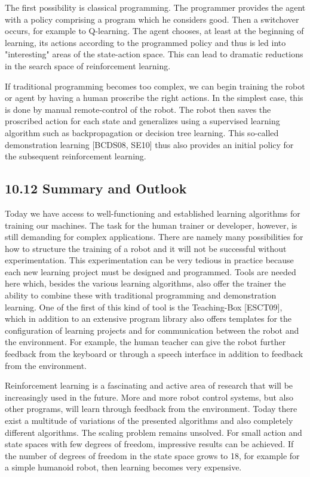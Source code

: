 \documentclass[10pt]{article}
\begin{document}
The first possibility is classical programming. The programmer provides the agent with a policy comprising a program which he considers good. Then a switchover occurs, for example to Q-learning. The agent chooses, at least at the beginning of learning, its actions according to the programmed policy and thus is led into "interesting" areas of the state-action space. This can lead to dramatic reductions in the search space of reinforcement learning.

If traditional programming becomes too complex, we can begin training the robot or agent by having a human proscribe the right actions. In the simplest case, this is done by manual remote-control of the robot. The robot then saves the proscribed action for each state and generalizes using a supervised learning algorithm such as backpropagation or decision tree learning. This so-called demonstration learning [BCDS08, SE10] thus also provides an initial policy for the subsequent reinforcement learning.

\subsection*{10.12 Summary and Outlook}
Today we have access to well-functioning and established learning algorithms for training our machines. The task for the human trainer or developer, however, is still demanding for complex applications. There are namely many possibilities for how to structure the training of a robot and it will not be successful without experimentation. This experimentation can be very tedious in practice because each new learning project must be designed and programmed. Tools are needed here which, besides the various learning algorithms, also offer the trainer the ability to combine these with traditional programming and demonstration learning. One of the first of this kind of tool is the Teaching-Box [ESCT09], which in addition to an extensive program library also offers templates for the configuration of learning projects and for communication between the robot and the environment. For example, the human teacher can give the robot further feedback from the keyboard or through a speech interface in addition to feedback from the environment.

Reinforcement learning is a fascinating and active area of research that will be increasingly used in the future. More and more robot control systems, but also other programs, will learn through feedback from the environment. Today there exist a multitude of variations of the presented algorithms and also completely different algorithms. The scaling problem remains unsolved. For small action and state spaces with few degrees of freedom, impressive results can be achieved. If the number of degrees of freedom in the state space grows to 18, for example for a simple humanoid robot, then learning becomes very expensive.
\end{document}
